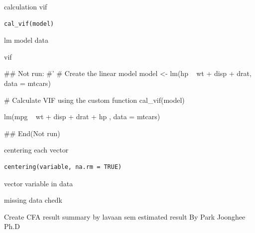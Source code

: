 \documentclass[a4paper]{book}
\begin{document}
%
\begin{Description}
calculation vif
\end{Description}
%
\begin{Usage}
\begin{verbatim}
cal_vif(model)
\end{verbatim}
\end{Usage}
%
\begin{Arguments}
\begin{ldescription}
\item[\code{model}] lm model data
\end{ldescription}
\end{Arguments}
%
\begin{Value}
vif
\end{Value}
%
\begin{Examples}
\begin{ExampleCode}

\#\# Not run: 
#'
# Create the linear model
model <- lm(hp ~ wt + disp + drat, data = mtcars)

# Calculate VIF using the custom function
cal_vif(model)

lm(mpg ~ wt + disp + drat + hp , data = mtcars) %



## End(Not run)
\end{ExampleCode}
\end{Examples}
%
\begin{Description}
centering each vector
\end{Description}
%
\begin{Usage}
\begin{verbatim}
centering(variable, na.rm = TRUE)
\end{verbatim}
\end{Usage}
%
\begin{Arguments}
\begin{ldescription}
\item[\code{variable}] vector variable in data

\item[\code{na.rm}] missing data chedk
\end{ldescription}
\end{Arguments}
%
\begin{Description}
Create CFA result summary by lavaan sem estimated result By Park Joonghee Ph.D
\end{Description}
\end{document}
